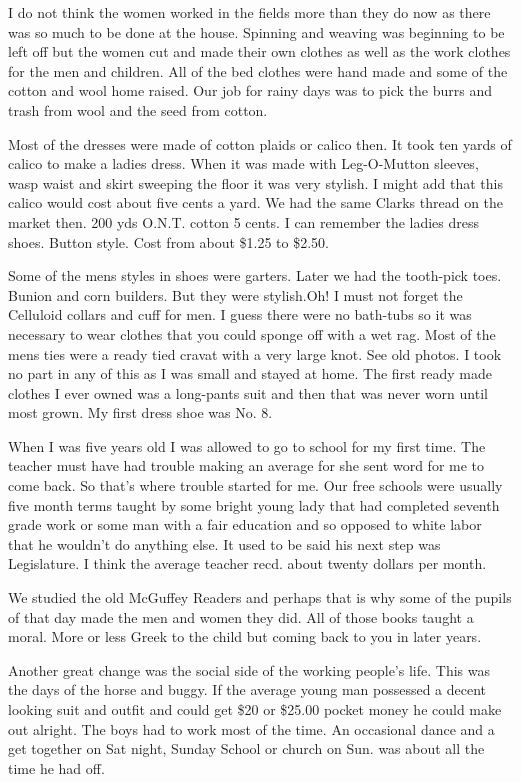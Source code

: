 I do not think the women worked in the fields more than they do now as there was so much to be done at the house. Spinning and weaving was beginning to be left off but the women cut and made their own clothes as well as the work clothes for the men and children. All of the bed clothes were hand made and some of the cotton and wool home raised. Our job for rainy days was to pick the burrs and trash from wool and the seed from cotton. 

Most of the dresses were made of cotton plaids or calico then. It took ten yards of calico to make a  ladies dress. When it was made with Leg-O-Mutton sleeves, wasp waist and skirt sweeping the floor it was very stylish. I might add that this calico would cost about five cents a yard. We had the same Clarks thread on the market then. 200 yds O.N.T. cotton 5 cents. I can remember the ladies dress shoes. Button style. Cost from about \$1.25 to \$2.50. 

Some of the mens styles in shoes were garters. Later we had the tooth-pick toes. Bunion and corn builders. But they were stylish.Oh! I must not forget the Celluloid collars and cuff for men. I guess there were no bath-tubs so it was necessary to wear clothes that you could sponge off with a wet rag. Most of the mens ties were a ready tied cravat with a very large knot. See old photos. I took no part in any of this as I was small and stayed at home. The first ready made clothes I ever owned  was a long-pants suit and then that was never worn until most grown. My first dress shoe was No. 8. 

When I was five years old I was allowed to go to school for my first time. The teacher must have had trouble making an average for she sent word for me to come back. So that's where trouble started for me. Our free schools were usually five month terms taught by some bright young lady that had completed seventh grade work or some man with a fair education and so opposed to white labor that he wouldn't do anything else.  It used to be said his next step was Legislature. I think the average teacher recd. about twenty dollars per month. 

We studied the old McGuffey Readers and perhaps that is why some of the pupils of that day made the men and women they did. All of those books taught a moral. More or less Greek to the child but coming back to you in later years.

Another great change was the social side of the working people's life. This was the days of the horse and buggy. If the average young man possessed a decent looking suit and outfit and could get \$20 or \$25.00 pocket money he could make out alright. The boys had to work most of the time. An occasional dance and a get together on Sat night, Sunday School or church on Sun. was about all the time he had off. 

